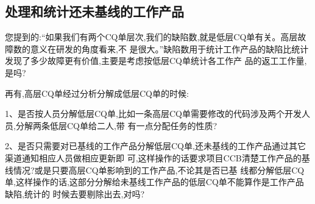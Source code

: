 \documentclass[11pt]{article}
\begin{document}
\subsection{处理和统计还未基线的工作产品}
\begin{myquote}
  您提到的:``如果我们有两个CQ单层次,我们的缺陷数,就是低层CQ单有关。高层故障数的意义在研发的角度看来,不
  是很大。''缺陷数用于统计工作产品的缺陷比统计发现了多少故障更有价值,主要是考虑按低层CQ单统计各工作产
  品的返工工作量,是吗?
\end{myquote}

\begin{comment}
  是的。所有度量体系需要的,如缺陷数、返工量,都只需要低层(工作产品层面)的就够了。要不然数值就会重复了。
  可以说,在项目的观点,我们关注缺陷数,而不是失效的次数,或是故障数。TL9000要求的,如客户问题单数,就是故障
  数。这个数值,应该是从客户支持中心的体系得到的。要不然项目就不能专注在研发活动了。这个在IPD的组织方
  面,跨领域产品研发团队要负责故障(客户问题单)统计,开发的功能团队(就是现在的项目)就负责缺陷统计。

  请留意,Rational也有两个层面的,但他们不叫``故障''(我也没叫高层CQ单人和名称,只是说``故障''比工作产品
  的CQ单高一个层次。),叫``关联任务''或是什么的。我忘了。

\end{comment}

\begin{myquote}
  再有,高层CQ单经过分析分解成低层CQ单的时候:

  1、是否按人员分解低层CQ单,比如一条高层CQ单需要修改的代码涉及两个开发人员,分解两条低层CQ单给二人,带
  有一点分配任务的性质?

\end{myquote}

\begin{comment}
  是的。按人员分CQ单是最自然、有效的。这个不是配置管理的原则,而是实际的效果。
\end{comment}

\begin{myquote}
  2、是否只需要对已基线的工作产品分解低层CQ单,还未基线的工作产品通过其它渠道通知相应人员做相应更新即
  可,这样操作的话要求项目CCB清楚工作产品的基线情况?或是只要高层CQ单影响到的工作产品,不论其是否已基
  线都分解低层CQ单,这样操作的话,这部分分解给未基线工作产品的低层CQ单不能算作是工作产品缺陷,统计的
  时候去要剔除出去,对吗?

\end{myquote}
\end{document}
